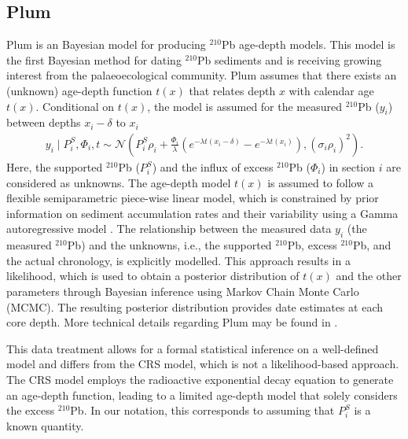 \documentclass [10pt] {article}
\newcommand{\ac}{\color{red} }  %
\newcommand{\ca}{\color{black}} %
\begin{document}


\subsection{Plum}

Plum \citep{Aquino2018} is an Bayesian model for producing $^{210}$Pb age-depth models.
This model is the first Bayesian method for dating $^{210}$Pb sediments and is receiving growing interest from the palaeoecological community.%
Plum assumes that there exists an (unknown) age-depth function $t(x)$ that relates depth $x$ with calendar age $t(x)$. 
Conditional on $t(x)$, the model is assumed for the measured $^{210}$Pb ($y_i$) between depths $x_i - \delta$ to $x_i$
\begin{eqnarray}
y_i \mid P^S_i, \Phi_i, t \sim \mathcal{N} \left(P^S_i \rho_i +\frac{\Phi_i}{\lambda} \left( e^{-\lambda t(x_i-\delta)} - e^{-\lambda t(x_i)} \right), (\sigma_i\rho_i)^2 \right). 
\end{eqnarray}
Here, the supported $^{210}$Pb ($P_i^S$) and the influx of excess $^{210}$Pb ($\Phi_i$) in section $i$ are considered as unknowns. The age-depth model $t(x)$ is assumed to follow a flexible semiparametric piece-wise linear model, which is constrained by prior information on sediment accumulation rates and their variability using a Gamma autoregressive model \citep{Blaauw2011}. The relationship between the measured data $y_i$ (the measured $^{210}$Pb) and the unknowns, i.e., the supported $^{210}$Pb, excess $^{210}$Pb, and the actual chronology, is explicitly modelled. This approach results in a likelihood, which is used to obtain a posterior distribution of $t(x)$ and the other parameters through Bayesian inference using Markov Chain Monte Carlo (MCMC). The resulting posterior distribution provides date estimates at each core depth. More technical details regarding Plum may be found in \citep{Aquino2018}.

This data treatment allows for a formal statistical inference on a well-defined model and differs from the CRS model, which is not a likelihood-based approach. The CRS model employs the radioactive exponential decay equation to generate an age-depth function, leading to a limited age-depth model that solely considers the excess $^{210}$Pb. In our notation, this corresponds to assuming that $P_i^S$ is a known quantity. 
\end{document}
